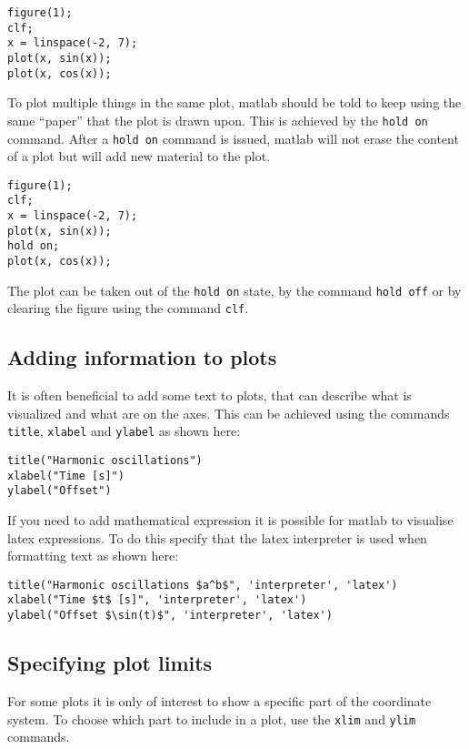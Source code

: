\documentclass[fleqn, 12pt,a4paper]{article}
\newcounter{ex}
\numberwithin{ex}{section}
\begin{document}
\begin{lstlisting}
figure(1);
clf; 
x = linspace(-2, 7);
plot(x, sin(x));
plot(x, cos(x));
\end{lstlisting}

To plot multiple things in the same plot, matlab should be told
to keep using the same ``paper'' that the plot is drawn upon.
This is achieved by the \verb!hold on! command.
After a \verb!hold on! command is issued, matlab will not erase 
the content of a plot but will add new material to the plot.

\begin{lstlisting}
figure(1);
clf; 
x = linspace(-2, 7);
plot(x, sin(x));
hold on;
plot(x, cos(x));
\end{lstlisting}

The plot can be taken out of the \verb!hold on! state, by the 
command \verb!hold off! or by clearing the figure using the 
command \verb!clf!.


\subsection{Adding information to plots}
\label{ssecAddingInformationToPlots}

It is often beneficial to add some text to plots, 
that can describe what is visualized and what are on the 
axes. 
This can be achieved using the commands \verb!title!, 
\verb!xlabel! and \verb!ylabel! as shown here:
\begin{lstlisting}
title("Harmonic oscillations")
xlabel("Time [s]")
ylabel("Offset")
\end{lstlisting}

If you need to add mathematical expression it is possible 
for matlab to visualise latex expressions.
To do this specify that the latex interpreter is used when 
formatting text as shown here:
\begin{lstlisting}
title("Harmonic oscillations $a^b$", 'interpreter', 'latex')
xlabel("Time $t$ [s]", 'interpreter', 'latex')
ylabel("Offset $\sin(t)$", 'interpreter', 'latex')
\end{lstlisting}


\subsection{Specifying plot limits}

For some plots it is only of interest to show a specific 
part of the coordinate system.
To choose which part to include in a plot, use the 
\verb!xlim! and \verb!ylim! commands.
\end{document}
